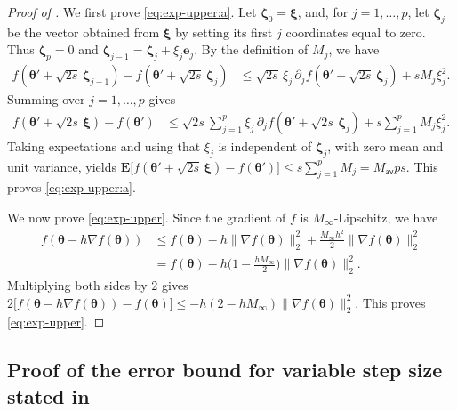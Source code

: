 \documentclass[aos,reqno]{imsart}
\newcommand\bs{\boldsymbol}
\newcommand\bse{\boldsymbol e}
\newcommand\bxi{\boldsymbol\xi}
\newcommand\bzeta{\bs \zeta}
\newcommand\btheta{\boldsymbol\theta}
\def\Mav{M_{\textsf{av}}}
\def\Mmax{M_{\infty}}
\theoremstyle{definition}
\begin{document}
\begin{proof}[Proof of ]
    We first prove \eqref{eq:exp-upper:a}. Let
    $\bzeta_0=\bxi$, and, for $j=1,\ldots,p$, let
    $\bzeta_j$ be the vector obtained from $\bxi$ by
    setting its first $j$ coordinates equal to zero.
    Thus $\bzeta_p=0$ and
    $\bzeta_{j-1}=\bzeta_j+\xi_j\bse_j$. By the definition
    of $M_j$, we have
    \begin{align}
        f(\btheta'+\sqrt{2s}\,\bzeta_{j-1})
        -f(\btheta'+\sqrt{2s}\,\bzeta_j)
        &\leqslant
        \sqrt{2s}\,\xi_j\,
        \partial_j f(\btheta'+\sqrt{2s}\,\bzeta_j)
        +sM_j\xi_j^2.
    \end{align}
    Summing over $j=1,\ldots,p$ gives
    \begin{align}
        f(\btheta'+\sqrt{2s}\,\bxi)-f(\btheta')
        &\leqslant
        \sqrt{2s}\sum_{j=1}^p
        \xi_j\,\partial_j f(\btheta'+\sqrt{2s}\,\bzeta_j)
        +s\sum_{j=1}^p M_j\xi_j^2.
    \end{align}
    Taking expectations and using that $\xi_j$ is 
    independent of $\bzeta_j$, with zero mean and 
    unit variance, yields $\mathbf E\big[ f(\btheta' 
    + \sqrt{2s}\,\bxi)-f(\btheta') \big] \leqslant 
    s\sum_{j=1}^p M_j = \Mav ps$. This proves 
    \eqref{eq:exp-upper:a}.

    We now prove \eqref{eq:exp-upper}. Since the gradient 
    of $f$ is $\Mmax$-Lipschitz, we have
    \begin{align}
        f(\btheta-h\nabla f(\btheta))
        &\leqslant
        f(\btheta)
        -h\|\nabla f(\btheta)\|_2^2
        +\frac{\Mmax h^2}{2}\|\nabla f(\btheta)\|_2^2 \\
        &=
        f(\btheta)
        -h\Big(1-\frac{h\Mmax}{2}\Big)
        \|\nabla f(\btheta)\|_2^2.
    \end{align}
    Multiplying both sides by $2$ gives
    $2\big[f(\btheta-h\nabla f(\btheta))-f(\btheta)\big]
        \leqslant -h(2-h\Mmax)\|\nabla f(\btheta)\|_2^2$.
    This proves \eqref{eq:exp-upper}.
\end{proof}

\subsection{Proof of the error bound for variable step
size stated in }
\end{document}
